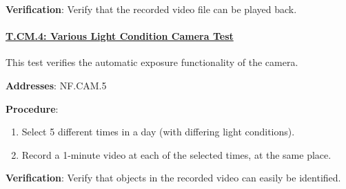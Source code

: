\textbf{Verification}: 
Verify that the recorded video file can be played back.

%

\paragraph{\underline{T.CM.4: Various Light Condition Camera Test}}

This test verifies the automatic exposure functionality of the camera.

\textbf{Addresses}: NF.CAM.5

\textbf{Procedure}:
\begin{enumerate}[noitemsep]
    \item Select 5 different times in a day (with differing light conditions).
    \item Record a 1-minute video at each of the selected times, at the same place.
\end{enumerate}

\textbf{Verification}: 
Verify that objects in the recorded video can easily be identified.